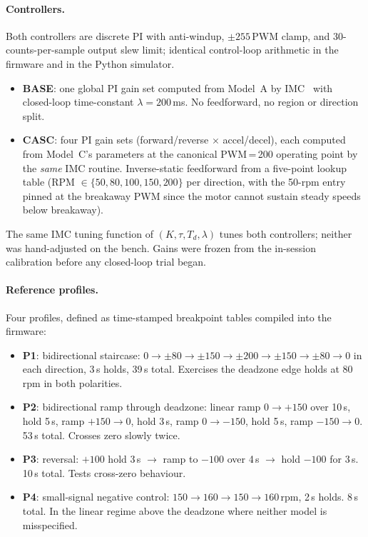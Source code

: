 \paragraph{Controllers.} Both controllers are discrete PI with anti-windup, $\pm 255$\,PWM clamp, and 30-counts-per-sample output slew limit; identical control-loop arithmetic in the firmware and in the Python simulator.
\begin{itemize}
  \item \textbf{BASE}: one global PI gain set computed from Model~A by IMC~\citep{franklin2019} with closed-loop time-constant $\lambda = 200$\,ms. No feedforward, no region or direction split.
  \item \textbf{CASC}: four PI gain sets (forward/reverse $\times$ accel/decel), each computed from Model~C's parameters at the canonical PWM\,=\,200 operating point by the \emph{same} IMC routine. Inverse-static feedforward from a five-point lookup table (RPM $\in \{50, 80, 100, 150, 200\}$ per direction, with the 50-rpm entry pinned at the breakaway PWM since the motor cannot sustain steady speeds below breakaway).
\end{itemize}
The same IMC tuning function of $(K, \tau, T_d, \lambda)$ tunes both controllers; neither was hand-adjusted on the bench. Gains were frozen from the in-session calibration before any closed-loop trial began.

\paragraph{Reference profiles.} Four profiles, defined as time-stamped breakpoint tables compiled into the firmware:
\begin{itemize}
  \item \textbf{P1}: bidirectional staircase: $0 \to \pm 80 \to \pm 150 \to \pm 200 \to \pm 150 \to \pm 80 \to 0$ in each direction, 3\,s holds, 39\,s total. Exercises the deadzone edge holds at 80\,rpm in both polarities.
  \item \textbf{P2}: bidirectional ramp through deadzone: linear ramp $0 \to +150$ over 10\,s, hold 5\,s, ramp $+150 \to 0$, hold 3\,s, ramp $0 \to -150$, hold 5\,s, ramp $-150 \to 0$. 53\,s total. Crosses zero slowly twice.
  \item \textbf{P3}: reversal: $+100$ hold 3\,s $\to$ ramp to $-100$ over 4\,s $\to$ hold $-100$ for 3\,s. 10\,s total. Tests cross-zero behaviour.
  \item \textbf{P4}: small-signal negative control: $150 \to 160 \to 150 \to 160$\,rpm, 2\,s holds. 8\,s total. In the linear regime above the deadzone where neither model is misspecified.
\end{itemize}

